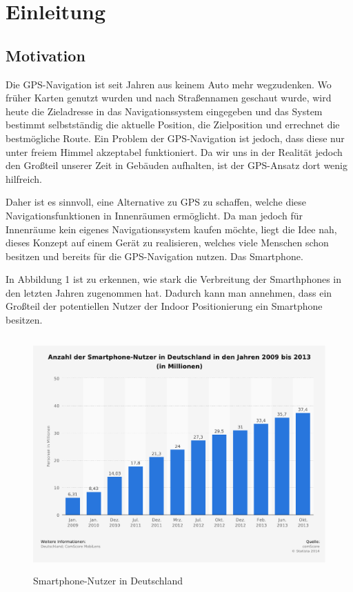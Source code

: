 \chapter{Einleitung}
\label{chap:introduction}

\section{Motivation}
\label{sec:introduction:motivation}

Die GPS-Navigation ist seit Jahren aus keinem Auto mehr wegzudenken. Wo früher Karten genutzt wurden und nach Straßennamen geschaut wurde, wird heute die Zieladresse in das Navigationssystem eingegeben und das System bestimmt selbstständig die aktuelle Position, die Zielposition und errechnet die bestmögliche Route.
Ein Problem der GPS-Navigation ist jedoch, dass diese nur unter freiem Himmel akzeptabel funktioniert.
Da wir uns in der Realität jedoch den Großteil unserer Zeit in Gebäuden aufhalten, ist der GPS-Ansatz dort wenig hilfreich.

Daher ist es sinnvoll, eine Alternative zu GPS zu schaffen, welche diese Navigationsfunktionen in Innenräumen ermöglicht.
Da man jedoch für Innenräume kein eigenes Navigationssystem kaufen möchte, liegt die Idee nah, dieses Konzept auf einem Gerät zu realisieren, welches viele Menschen schon besitzen und bereits für die GPS-Navigation nutzen. 
Das Smartphone.

In Abbildung 1 ist zu erkennen, wie stark die Verbreitung der Smarthphones in den letzten Jahren zugenommen hat. Dadurch kann man annehmen, dass ein Großteil der potentiellen Nutzer der Indoor Positionierung ein Smartphone besitzen.
\begin{figure}[htb]
	\centering
		\includegraphics[height=9cm]{pictures/smartphones-germany}
		\caption{Smartphone-Nutzer in Deutschland \cite{statistic-smartphones}}
\end{figure}

